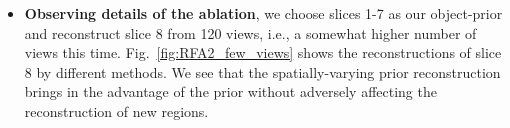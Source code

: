 \documentclass[journal]{IEEEtran}
\begin{document}
\begin{itemize}
\item \textbf{Observing details of the ablation}, we choose slices 1-7 as our object-prior and reconstruct slice 8 from 120 views, i.e., a somewhat higher number of views this time. Fig.~\ref{fig:RFA2_few_views} shows the reconstructions of slice 8 by different methods. We see that the spatially-varying prior reconstruction brings in the advantage of the prior without adversely affecting the reconstruction of new regions.
  \end{itemize}
\begin{figure}[!h]
\centering
{}\hfill
{}\hfill
{}\hfill
{}

\end{figure}
\end{document}
